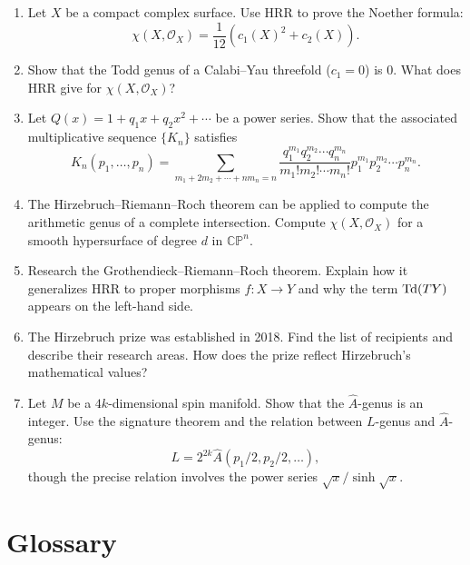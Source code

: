 \begin{enumerate}
    \item [I] Let \(X\) be a compact complex surface. Use HRR to prove the
    Noether formula:
    \[
    \chi(X, \mathcal{O}_X) = \frac1{12}(c_1(X)^2 + c_2(X)).
    \]

    \item [I] Show that the Todd genus of a Calabi--Yau threefold
    (\(c_1 = 0\)) is \(0\). What does HRR give for
    \(\chi(X, \mathcal{O}_X)\)?

    \item [A] Let \(Q(x) = 1 + q_1 x + q_2 x^2 + \cdots\) be a power
    series. Show that the associated multiplicative sequence
    \(\{K_n\}\) satisfies
    \[
    K_n(p_1, \dots, p_n) = \sum_{m_1 + 2m_2 + \cdots + nm_n = n}
    \frac{q_1^{m_1} q_2^{m_2} \cdots q_n^{m_n}}{m_1! m_2! \cdots m_n!}
    p_1^{m_1} p_2^{m_2} \cdots p_n^{m_n}.
    \]

    \item [I] The Hirzebruch--Riemann--Roch theorem can be applied to
    compute the arithmetic genus of a complete intersection. Compute
    \(\chi(X, \mathcal{O}_X)\) for a smooth hypersurface of degree
    \(d\) in \(\mathbb{CP}^n\).

    \item [A] Research the Grothendieck--Riemann--Roch theorem. Explain
    how it generalizes HRR to proper morphisms \(f: X \to Y\) and why
    the term \(\operatorname{Td}(TY)\) appears on the left-hand side.

    \item [B] The Hirzebruch prize was established in 2018. Find the list
    of recipients and describe their research areas. How does the
    prize reflect Hirzebruch's mathematical values?

    \item [A] Let \(M\) be a \(4k\)-dimensional spin manifold. Show that
    the \(\hat{A}\)-genus is an integer. Use the signature theorem and
    the relation between \(L\)-genus and \(\hat{A}\)-genus:
    \[
    L = 2^{2k} \hat{A}(p_1/2, p_2/2, \dots),
    \]
    though the precise relation involves the power series
    \(\sqrt{x}/\sinh\sqrt{x}\).
\end{enumerate}

\section*{Glossary}

